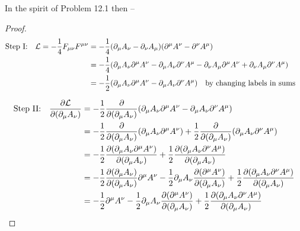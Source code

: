 \documentclass[letterpaper]{article}
\theoremstyle{definition}
\begin{document}
In the spirit of Problem 12.1 then --

\begin{proof}


  \begin{align*}
    \qq*{Step I:}\mathcal{L}=-\frac{1}{4}F_{\mu\nu}F^{\mu\nu} & =-\frac{1}{4}\pqty{\partial_\mu A_\nu-\partial_\nu A_\mu}\pqty{\partial^\mu A^\nu-\partial^\nu A^\mu}                                                                         \\
                                                              & =-\frac{1}{4}\pqty{\partial_\mu A_\nu \partial^\mu A^\nu -\partial_\mu A_\nu \partial^\nu A^\mu-\partial_\nu A_\mu \partial^\mu A^\nu +\partial_\nu A_\mu \partial^\nu A^\mu} \\
                                                              & =-\frac{1}{2}\pqty{\partial_\mu A_\nu \partial^\mu A^\nu -\partial_\mu A_\nu \partial^\nu A^\mu}\qq{by changing labels in sums}
  \end{align*}



  \begin{align*}
    \qq*{Step II:}\pdv{\mathcal{L}}{(\partial_\mu A_\nu)} & =-\frac{1}{2}\pdv{(\partial_\mu A_\nu)}\pqty{\partial_\mu A_\nu \partial^\mu A^\nu -\partial_\mu A_\nu \partial^\nu A^\mu}                                                                                                                                    \\
                                                          & =-\frac{1}{2}\pdv{(\partial_\mu A_\nu)}\pqty{\partial_\mu A_\nu \partial^\mu A^\nu}+\frac{1}{2}\pdv{(\partial_\mu A_\nu)}\pqty{\partial_\mu A_\nu \partial^\nu A^\mu}                                                                                         \\
                                                          & =-\frac{1}{2}\pdv{\pqty{\partial_\mu A_\nu \partial^\mu A^\nu}}{(\partial_\mu A_\nu)}+\frac{1}{2}\pdv{\pqty{\partial_\mu A_\nu \partial^\nu A^\mu}}{(\partial_\mu A_\nu)}                                                                                     \\
                                                          & =-\frac{1}{2}\pdv{\pqty{\partial_\mu A_\nu }}{(\partial_\mu A_\nu)}\partial^\mu A^\nu-\frac{1}{2}\partial_\mu A_\nu\pdv{\pqty{ \partial^\mu A^\nu}}{(\partial_\mu A_\nu)}+\frac{1}{2}\pdv{\pqty{\partial_\mu A_\nu \partial^\nu A^\mu}}{(\partial_\mu A_\nu)} \\
                                                          & =-\frac{1}{2}\partial^\mu A^\nu-\frac{1}{2}\partial_\mu A_\nu\pdv{\pqty{ \partial^\mu A^\nu}}{(\partial_\mu A_\nu)}+\frac{1}{2}\pdv{\pqty{\partial_\mu A_\nu \partial^\nu A^\mu}}{(\partial_\mu A_\nu)}                                                       \\
  \end{align*}


\end{proof}
\end{document}
